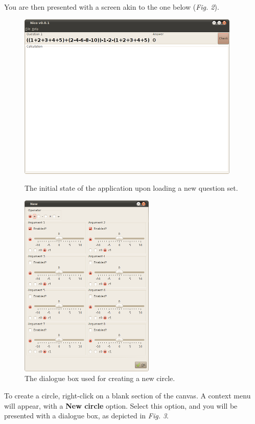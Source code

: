 \documentclass[14pt]{article}
\begin{document}
You are then presented with a screen akin to the one below (\emph{Fig. 2}).

\begin{figure}[!htb]
\begin{minipage}[b]{0.5\linewidth}
\centering
\includegraphics[scale=0.75]{fig2.png}
\caption{The initial state of the application upon loading a new question set.}
\end{minipage}
\hspace{0.5cm}
\begin{minipage}[b]{0.5\linewidth}
\centering
\includegraphics[scale=0.75]{fig3.png}
\caption{The dialogue box used for creating a new circle.}
\end{minipage}
\end{figure}

To create a circle, right-click on a blank section of the canvas.  A context menu
will appear, with a {\bf {\sffamily New circle}} option.  Select this option, and
you will be presented with a dialogue box, as depicted in \emph{Fig. 3}.
\end{document}

